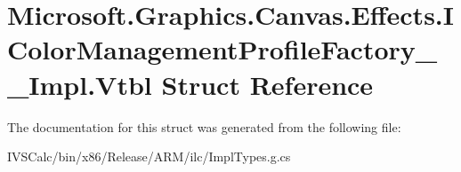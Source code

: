 \hypertarget{struct_microsoft_1_1_graphics_1_1_canvas_1_1_effects_1_1_i_color_management_profile_factory_____impl_1_1_vtbl}{}\section{Microsoft.\+Graphics.\+Canvas.\+Effects.\+I\+Color\+Management\+Profile\+Factory\+\_\+\+\_\+\+Impl.\+Vtbl Struct Reference}
\label{struct_microsoft_1_1_graphics_1_1_canvas_1_1_effects_1_1_i_color_management_profile_factory_____impl_1_1_vtbl}


The documentation for this struct was generated from the following file\+:\begin{DoxyCompactItemize}
\item 
I\+V\+S\+Calc/bin/x86/\+Release/\+A\+R\+M/ilc/Impl\+Types.\+g.\+cs\end{DoxyCompactItemize}
